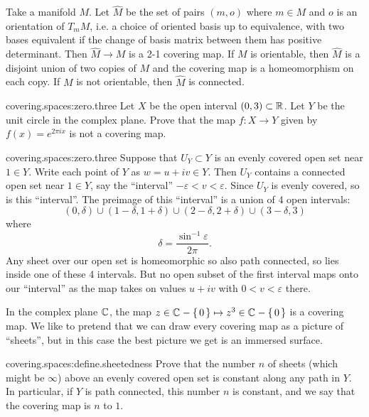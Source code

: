 \begin{example}
Take a manifold \(M\).
Let \(\hat{M}\) be the set of pairs \((m,o)\) where \(m \in M\) and \(o\) is an orientation of \(T_m M\), i.e. a choice of oriented basis up to equivalence, with two bases equivalent if the change of basis matrix between them has positive determinant.
Then \(\hat{M} \to M\) is a 2-1 covering map.
If \(M\) is orientable, then \(\hat{M}\) is a disjoint union of two copies of \(M\) and the covering map is a homeomorphism on each copy.
If \(M\) is not orientable, then \(\hat{M}\) is connected.
\end{example}
\begin{problem}{covering.spaces:zero.three}
Let \(X\) be the open interval \((0,3) \subset \mathbb{R}^{}\).
Let \(Y\) be the unit circle in the complex plane.
Prove that the map \(f \colon X \to Y\) given by \(f(x)=e^{2\pi ix}\) is not a covering map.
\end{problem}
\begin{answer}{covering.spaces:zero.three}
Suppose that \(U_Y \subset Y\) is an evenly covered open set near \(1 \in Y\).
Write each point of \(Y\) as \(w = u+iv \in Y\).
Then \(U_Y\) contains a connected open set near \(1 \in Y\), say the ``interval'' \(-\varepsilon < v < \varepsilon\).
Since \(U_Y\) is evenly covered, so is this ``interval''.
The preimage of this ``interval'' is a union of 4 open intervals: 
\[
(0,\delta) 
\cup (1-\delta,1+\delta)
\cup (2-\delta,2+\delta)
\cup (3-\delta,3)
\]
where 
\[
\delta = \frac{\sin^{-1} \varepsilon}{2 \pi}.
\]
Any sheet over our open set is homeomorphic so also path connected, so lies inside one of these 4 intervals.
But no open subset of the first interval maps onto our ``interval'' as the map takes on values \(u+iv\) with \(0 < v < \varepsilon\) there.
\end{answer}
\begin{exampleAndImage}{6.63cm}
In the complex plane \(\mathbb{C}^{}\), the map \(z \in \mathbb{C}^{}-\set{0} \mapsto z^3 \in \mathbb{C}^{}-\set{0}\) is a covering map.
We like to pretend that we can draw every covering map as a picture of ``sheets'', but in this case the best picture we get is an immersed surface.
\tcblower

\end{exampleAndImage}
\begin{problem}{covering.spaces:define.sheetedness}
Prove that the number \(n\) of sheets (which might be \(\infty\)) above an evenly covered open set is constant along any path in \(Y\).
In particular, if \(Y\) is path connected, this number \(n\) is constant, and we say that the covering map is \(n\) to \(1\).
\end{problem}
